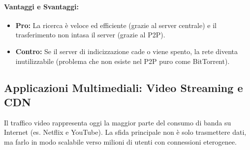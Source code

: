 \documentclass[a4paper,12pt]{report}
\begin{document}
\paragraph{Vantaggi e Svantaggi:}
\begin{itemize}
    \item \textbf{Pro:} La ricerca è veloce ed efficiente (grazie al server centrale) e il trasferimento non intasa il server (grazie al P2P).
    \item \textbf{Contro:} Se il server di indicizzazione cade o viene spento, la rete diventa inutilizzabile (problema che non esiste nel P2P puro come BitTorrent).
\end{itemize}








\newpage
\subsection{Applicazioni Multimediali: Video Streaming e CDN}

Il traffico video rappresenta oggi la maggior parte del consumo di banda su Internet (es. Netflix e YouTube). La sfida principale non è solo trasmettere dati, ma farlo in modo scalabile verso milioni di utenti con connessioni eterogenee.
\end{document}
